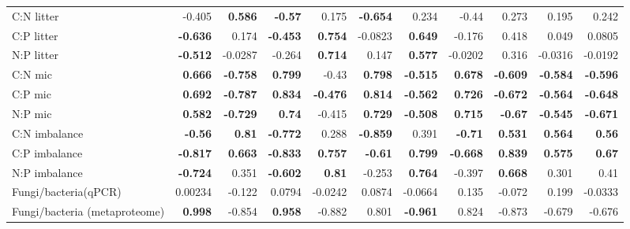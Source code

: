 \documentclass[10pt]{article}
\begin{document}
\begin{flushleft}
\begin{landscape}
\begin{table}[h!]
\begin{center}
{\begin{tabular}{lrrrrrrrrrr}
  C:N litter & -0.405 & \textbf{ 0.586 } & \textbf{ -0.57 } & 0.175 & \textbf{ -0.654 } & 0.234 & -0.44 & 0.273 & 0.195 & 0.242 \\ 
  C:P litter & \textbf{ -0.636 } & 0.174 & \textbf{ -0.453 } & \textbf{ 0.754 } & -0.0823 & \textbf{ 0.649 } & -0.176 & 0.418 & 0.049 & 0.0805 \\ 
  N:P litter & \textbf{ -0.512 } & -0.0287 & -0.264 & \textbf{ 0.714 } & 0.147 & \textbf{ 0.577 } & -0.0202 & 0.316 & -0.0316 & -0.0192 \\ 
  C:N mic & \textbf{ 0.666 } & \textbf{ -0.758 } & \textbf{ 0.799 } & -0.43 & \textbf{ 0.798 } & \textbf{ -0.515 } & \textbf{ 0.678 } & \textbf{ -0.609 } & \textbf{ -0.584 } & \textbf{ -0.596 } \\ 
  C:P mic & \textbf{ 0.692 } & \textbf{ -0.787 } & \textbf{ 0.834 } & \textbf{ -0.476 } & \textbf{ 0.814 } & \textbf{ -0.562 } & \textbf{ 0.726 } & \textbf{ -0.672 } & \textbf{ -0.564 } & \textbf{ -0.648 } \\ 
  N:P mic & \textbf{ 0.582 } & \textbf{ -0.729 } & \textbf{ 0.74 } & -0.415 & \textbf{ 0.729 } & \textbf{ -0.508 } & \textbf{ 0.715 } & \textbf{ -0.67 } & \textbf{ -0.545 } & \textbf{ -0.671 } \\ 
  C:N imbalance & \textbf{ -0.56 } & \textbf{ 0.81 } & \textbf{ -0.772 } & 0.288 & \textbf{ -0.859 } & 0.391 & \textbf{ -0.71 } & \textbf{ 0.531 } & \textbf{ 0.564 } & \textbf{ 0.56 } \\ 
  C:P imbalance & \textbf{ -0.817 } & \textbf{ 0.663 } & \textbf{ -0.833 } & \textbf{ 0.757 } & \textbf{ -0.61 } & \textbf{ 0.799 } & \textbf{ -0.668 } & \textbf{ 0.839 } & \textbf{ 0.575 } & \textbf{ 0.67 } \\ 
  N:P imbalance & \textbf{ -0.724 } & 0.351 & \textbf{ -0.602 } & \textbf{ 0.81 } & -0.253 & \textbf{ 0.764 } & -0.397 & \textbf{ 0.668 } & 0.301 & 0.41 \\ 
  Fungi/bacteria(qPCR) & 0.00234 & -0.122 & 0.0794 & -0.0242 & 0.0874 & -0.0664 & 0.135 & -0.072 & 0.199 & -0.0333 \\ 
  Fungi/bacteria (metaproteome) & \textbf{ 0.998 } & -0.854 & \textbf{ 0.958 } & -0.882 & 0.801 & \textbf{ -0.961 } & 0.824 & -0.873 & -0.679 & -0.676 \\ 
   \hline
\end{tabular}
}
\end{center}
\end{table}
\newpage
\begin{table}[h!]

\end{table}
\end{landscape}
\end{flushleft}
\end{document}
